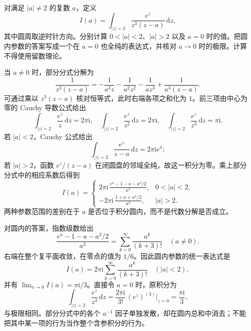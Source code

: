 \begin{exercise}\label{b3:ex:02-2}
对满足 \(|a|\ne2\) 的复数 \(a\)，定义
\[
  I(a)=\int_{|z|=2}\frac{e^z}{z^3(z-a)}\,\mathrm{d}z,
\]
其中圆周取逆时针方向。分别计算 \(0<|a|<2\)、\(|a|>2\) 以及 \(a=0\) 时的值。把圆内参数的答案写成一个在 \(a=0\) 也全纯的表达式，并核对 \(a\to0\) 时的极限。计算不得使用留数理论。
\end{exercise}
\begin{solution}
当 \(a\ne0\) 时，部分分式分解为
\[
  \frac1{z^3(z-a)}
  =-\frac1{a^3z}-\frac1{a^2z^2}
   -\frac1{az^3}+\frac1{a^3(z-a)}.
\]
可通过乘以 \(z^3(z-a)\) 核对恒等式，此时右端各项之和化为 \(1\)。前三项由中心为零的 Cauchy 导数公式给出
\[
  \int_{|z|=2}\frac{e^z}{z}\,\mathrm{d}z=2\pi\mathrm{i},
  \quad\int_{|z|=2}\frac{e^z}{z^2}\,\mathrm{d}z=2\pi\mathrm{i},
  \quad\int_{|z|=2}\frac{e^z}{z^3}\,\mathrm{d}z=\pi\mathrm{i}.
\]
若 \(|a|<2\)，Cauchy 公式给出
\[
  \int_{|z|=2}\frac{e^z}{z-a}\,\mathrm{d}z=2\pi\mathrm{i}e^a;
\]
若 \(|a|>2\)，函数 \(e^z/(z-a)\) 在闭圆盘的邻域全纯，故这一积分为零。乘上部分分式中的相应系数后得到
\[
  I(a)=
  \begin{cases}
    \displaystyle 2\pi\mathrm{i}\,
      \frac{e^a-1-a-a^2/2}{a^3},&0<|a|<2,\\[6pt]
    \displaystyle-2\pi\mathrm{i}\,
      \frac{1+a+a^2/2}{a^3},&|a|>2.
  \end{cases}
\]
两种参数范围的差别在于 \(a\) 是否位于积分圆内，而不是代数分解是否成立。

对圆内的答案，指数级数给出
\[
  \frac{e^a-1-a-a^2/2}{a^3}
  =\sum_{k=0}^{\infty}\frac{a^k}{(k+3)!}\quad(a\ne0).
\]
右端在整个复平面收敛，在零点的值为 \(1/6\)。因此圆内参数的统一表达式是
\[
  I(a)=2\pi\mathrm{i}\sum_{k=0}^{\infty}\frac{a^k}{(k+3)!}
  \quad(|a|<2),
\]
并有 \(\lim_{a\to0}I(a)=\pi\mathrm{i}/3\)。直接令 \(a=0\) 时，原积分为
\[
  \int_{|z|=2}\frac{e^z}{z^4}\,\mathrm{d}z
  =\frac{2\pi\mathrm{i}}{3!}\,(e^z)^{(3)}\big|_{z=0}
  =\frac{\pi\mathrm{i}}3,
\]
与极限相同。部分分式中的各个 \(a^{-1}\) 因子单独发散，却在圆内总和中消去；不能把其中某一项的行为当作整个含参积分的行为。
\end{solution}

